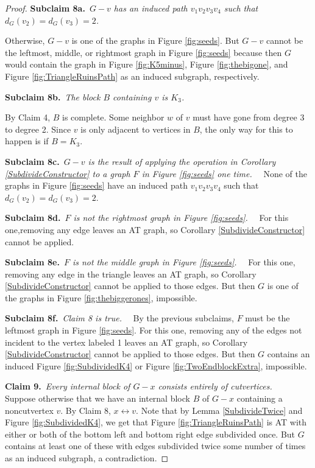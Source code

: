 \documentclass[12pt]{article}
\theoremstyle{plain}
\theoremstyle{definition}
\theoremstyle{remark}
\def\adj{\leftrightarrow}
\newcommand{\claim}[2]{{\bf Claim #1.}~{\it #2}~~}
\newcommand{\subclaim}[2]{{\bf Subclaim #1.}~{\it #2}~~}
\def\adj{\leftrightarrow}
\begin{document}
\begin{proof}
	 \subclaim{8a}{$G-v$ has an induced path $v_1v_2v_3v_4$ such that $d_G(v_2) = d_G(v_3) = 2$.}
	 
	 Otherwise, $G-v$ is one of the graphs in Figure \ref{fig:seeds}.  But $G-v$ cannot be the leftmost, middle, or rightmost graph in Figure \ref{fig:seeds} because then $G$ would contain the graph in Figure \ref{fig:K5minus}, Figure \ref{fig:thebigone}, and Figure \ref{fig:TriangleRuinsPath} as an induced subgraph, respectively.  
	 	 
	 \subclaim{8b}{The block $B$ containing $v$ is $K_3$.}
	 
	 By Claim 4, $B$ is complete. Some neighbor $w$ of $v$ must have gone from degree 3 to degree 2. Since $v$ is only adjacent to vertices in $B$,	 
	 the only way for this to happen is if $B = K_3$.  
	 
	 \subclaim{8c}{$G-v$ is the result of applying the operation in Corollary \ref{SubdivideConstructor} to a graph $F$ in Figure \ref{fig:seeds} one time.}
	 None of the graphs in Figure \ref{fig:seeds} have an induced path $v_1v_2v_3v_4$ such that $d_G(v_2) = d_G(v_3) = 2$.

	 \subclaim{8d}{$F$ is not the rightmost graph in Figure \ref{fig:seeds}.}
	 For this one,removing any edge leaves an AT graph, so Corollary \ref{SubdivideConstructor} cannot be applied.
	
	 \subclaim{8e}{$F$ is not the middle graph in Figure \ref{fig:seeds}.}
 	  For this one, removing any edge in the triangle leaves an AT graph, so Corollary \ref{SubdivideConstructor} cannot be applied to those edges.  But then $G$ is one of the graphs in Figure \ref{fig:thebiggerones}, impossible.
	 
	 \subclaim{8f}{Claim 8 is true.}
	 By the previous subclaims, $F$ must be the leftmost graph in Figure \ref{fig:seeds}. For this one, removing any of the edges not incident to the vertex labeled 1 leaves an AT graph, so Corollary \ref{SubdivideConstructor} cannot be applied to those edges.  But then $G$ contains an induced Figure \ref{fig:SubdividedK4} or Figure \ref{fig:TwoEndblockExtra}, impossible.
	 
	 \claim{9}{Every internal block of $G-x$ consists entirely of cutvertices.}
	 Suppose otherwise that we have an internal block $B$ of $G-x$ containing a noncutvertex $v$.  By Claim 8, $x \adj v$.  Note that by Lemma \ref{SubdivideTwice} and Figure \ref{fig:SubdividedK4}, we get that Figure \ref{fig:TriangleRuinsPath} is AT with either or both of the bottom left and bottom right edge subdivided once.  But $G$ contains at least one of these with edges subdivided twice some number of times as an induced subgraph, a contradiction.
	 

\end{proof}
\end{document}
